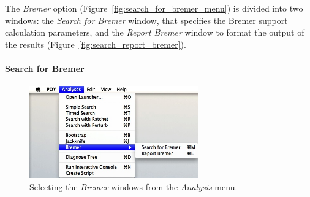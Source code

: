 {The \emph{Bremer} option (Figure~\ref{fig:search_for_bremer_menu}) is divided into two windows: the \emph{Search for Bremer} 
window, that specifies the Bremer support \cite{Bremer1988, Kallersjoetal1992} calculation parameters, and the \emph{Report Bremer} 
window to format the output of the results (Figure~\ref{fig:search_report_bremer}). 

\paragraph{Search for Bremer}

\begin{figure}[htpb]
    \begin{center}
        \includegraphics[width=0.65\textwidth]{doc/figures/searchforbremer_menu.jpg}
    \end{center}
    \caption{ Selecting the \emph{Bremer} windows from the \emph{Analysis} menu.}
    \label{fig:search_for_bermer_menu}
\end{figure}

}
